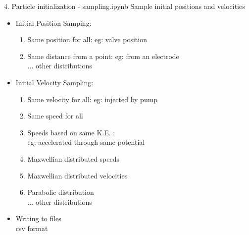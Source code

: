 \documentclass{beamer}
\begin{document}
	\begin{frame}[t]{4. Particle initialization - sampling.ipynb}
		Sample initial positions and velocities \\
		\begin{itemize}
			\item Initial Position Samping:
			\begin{enumerate}
				\item Same position for all: eg: valve position
				\item Same distance from a point: eg: from an electrode \\
				... other distributions
			\end{enumerate}
			\item Initial Velocity Sampling:
			\begin{enumerate}
				\item Same velocity for all: eg: injected by pump
				\item Same speed for all
				\item Speeds based on same K.E. : \\ eg: accelerated through same potential
				\item Maxwellian distributed speeds
				\item Maxwellian distributed velocities
				\item Parabolic distribution \\
				... other distributions
				
			\end{enumerate}
			
			\item Writing to files \\
			\hspace{0.5cm}csv format 
		\end{itemize}
		
	\end{frame}

	\begin{frame}
		
	\end{frame}
	\begin{frame}
		
	\end{frame}
	\begin{frame}
		
	\end{frame}
\end{document}
